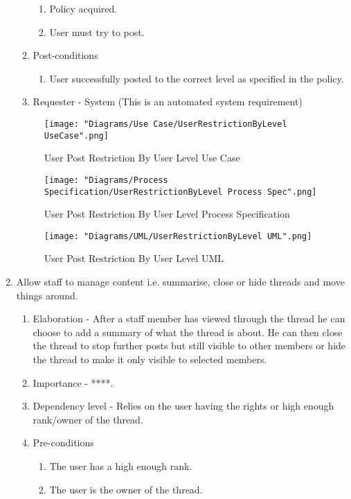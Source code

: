 \documentclass[12pt]{article}
\begin{document}
\begin{enumerate}
\begin{enumerate}
\begin{enumerate}
    	\item Policy acquired.
    	\item User must try to post.
    \end{enumerate}
        \item Post-conditions
    \begin{enumerate}
    	\item User successfully posted to the correct level as specified in the policy.
    \end{enumerate}
    \item Requester - System (This is an automated system requirement)
  \end{enumerate}
\begin{figure}[h]
	\centering
	\texttt{[image: "Diagrams/Use Case/UserRestrictionByLevel UseCase".png]}
	\caption{User Post Restriction By User Level Use Case}
\end{figure}
\begin{figure}[h]
	\centering
	\texttt{[image: "Diagrams/Process Specification/UserRestrictionByLevel Process Spec".png]}
	\caption{User Post Restriction By User Level Process Specification}
\end{figure}
\begin{figure}[h]
	\centering
	\texttt{[image: "Diagrams/UML/UserRestrictionByLevel UML".png]}
	\caption{User Post Restriction By User Level UML}
\end{figure}
\clearpage %
   \item  Allow staff to manage content i.e. summarise, close or hide threads and move things around.%
  \begin{enumerate}
    \item Elaboration - After a staff member has viewed through the thread he can choose to add a summary of what the thread is about. He can then close the thread to stop further posts but still visible to other members or hide the thread to make it only visible to selected members.
    \item Importance - ****.
    \item Dependency level - Relies on the user having the rights or high enough rank/owner of the thread.
    \item Pre-conditions
    \begin{enumerate}
    	\item The user has a high enough rank.
    	\item The user is the owner of the thread.

\end{enumerate}
\end{enumerate}
\end{enumerate}
\end{document}

